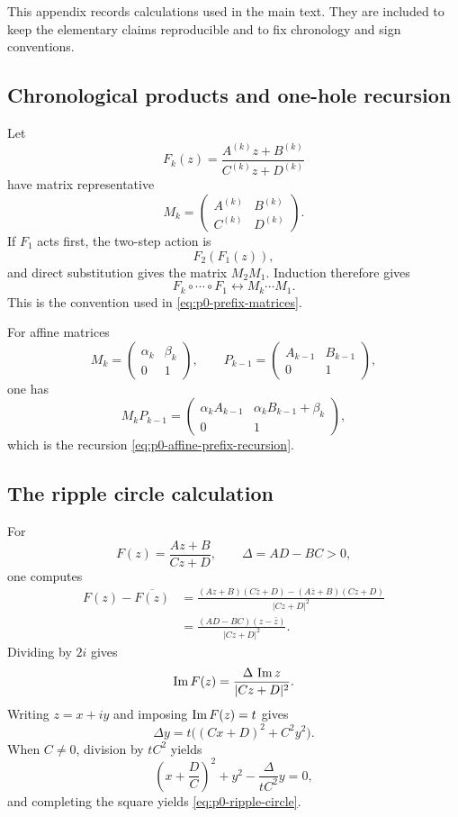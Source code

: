 This appendix records calculations used in the main text.  They are included
to keep the elementary claims reproducible and to fix chronology and sign
conventions.

\subsection{Chronological products and one-hole recursion}

Let
\[
  F_k(z)=\frac{A^{(k)}z+B^{(k)}}{C^{(k)}z+D^{(k)}}
\]
have matrix representative
\[
  M_k=
  \begin{pmatrix}
    A^{(k)}&B^{(k)}\\
    C^{(k)}&D^{(k)}
  \end{pmatrix}.
\]
If $F_1$ acts first, the two-step action is
\[
  F_2(F_1(z)),
\]
and direct substitution gives the matrix $M_2M_1$.  Induction therefore gives
\[
  F_k\circ\cdots\circ F_1
  \longleftrightarrow
  M_k\cdots M_1.
\]
This is the convention used in \eqref{eq:p0-prefix-matrices}.

For affine matrices
\[
  M_k=\begin{pmatrix}\alpha_k&\beta_k\\0&1\end{pmatrix},
  \qquad
  P_{k-1}=\begin{pmatrix}A_{k-1}&B_{k-1}\\0&1\end{pmatrix},
\]
one has
\[
  M_kP_{k-1}
  =\begin{pmatrix}
     \alpha_kA_{k-1}&\alpha_kB_{k-1}+\beta_k\\
     0&1
   \end{pmatrix},
\]
which is the recursion \eqref{eq:p0-affine-prefix-recursion}.

\subsection{The ripple circle calculation}

For
\[
  F(z)=\frac{Az+B}{Cz+D},
  \qquad
  \Delta=AD-BC>0,
\]
one computes
\begin{align*}
  F(z)-\overline{F(z)}
  &=\frac{(Az+B)(C\bar z+D)-(A\bar z+B)(Cz+D)}{|Cz+D|^2}\\
  &=\frac{(AD-BC)(z-\bar z)}{|Cz+D|^2}.
\end{align*}
Dividing by $2i$ gives
\[
  \operatorname{Im} F(z)=\frac{\Delta\,\operatorname{Im} z}{|Cz+D|^2}.
\]
Writing $z=x+iy$ and imposing $\operatorname{Im} F(z)=t$ gives
\[
  \Delta y=t\bigl((Cx+D)^2+C^2y^2\bigr).
\]
When $C\ne0$, division by $tC^2$ yields
\[
  \left(x+\frac DC\right)^2+y^2
  -\frac{\Delta}{tC^2}y=0,
\]
and completing the square yields \eqref{eq:p0-ripple-circle}.


